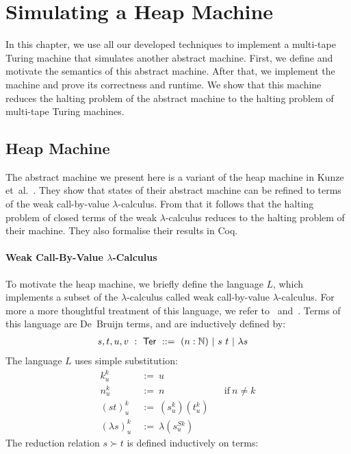 \chapter{Simulating a Heap Machine}
\label{chap:heap}

\newcommand{\subst}[3]{{#1}^{#2}_{#3}}
\newcommand{\Ter}{\MS{Ter}}
\newcommand{\red}{\succ}
\newcommand{\nred}{\nsucc}


In this chapter, we use all our developed techniques to implement a multi-tape Turing machine that simulates another abstract machine.  First, we
define and motivate the semantics of this abstract machine.  After that, we implement the machine and prove its correctness and runtime.  We show that
this machine reduces the halting problem of the abstract machine to the halting problem of multi-tape Turing machines.

\section{Heap Machine}
\label{sec:heap}

The abstract machine we present here is a variant of the heap machine in Kunze et~al.~\cite{KunzeEtAl:2018:Formal}.  They show that states of their
abstract machine can be refined to terms of the weak call-by-value $\lambda$-calculus.  From that it follows that the halting problem of closed terms
of the weak $\lambda$-calculus reduces to the halting problem of their machine.  They also formalise their results in Coq.

\subsubsection{Weak Call-By-Value $\lambda$-Calculus}
\label{sec:L}

To motivate the heap machine, we briefly define the language $L$, which implements a subset of the $\lambda$-calculus called weak call-by-value
$\lambda$-calculus.  For more a more thoughtful treatment of this language, we refer to~\cite{ForsterSmolka17} and~\cite{KunzeEtAl:2018:Formal}.
Terms of this language are De~Bruijn terms, and are inductively defined by:
\begin{align*}
  s,t,u,v &~:~\Ter~::=~ (n:\Nat) ~|~ s~t ~|~ \lambda s
\end{align*}
The language $L$ uses simple substitution:
\begin{align*}
  \subst kku &~:=~u \\
  \subst nku &~:=~n &&\text{if}~n\neq k \\
  \subst{(st)}ku &~:=~(\subst sku)(\subst tku) \\
  \subst{(\lambda s)}ku &~:=~\lambda(\subst s{Sk}u)
\end{align*}
The reduction relation $s \red t$ is defined inductively on terms:


